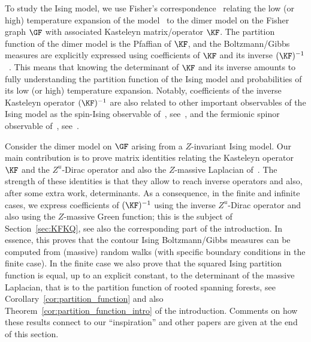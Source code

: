 \documentclass[a4paper,twoside,11pt]{article}
\begin{document}
To study the Ising model, we use Fisher's correspondence~\cite{Fisher} relating the low (or high) temperature expansion of the 
model~\cite{KramersWannier1,KramersWannier2} to the dimer model on the Fisher graph $\GF$ with associated Kasteleyn matrix/operator 
$\KF$. The partition function of the dimer model is the Pfaffian of $\KF$, and the Boltzmann/Gibbs measures are explicitly expressed
using coefficients of $\KF$ and its inverse $(\KF)^{-1}$~\cite{TF,Kenyon0,CKP,KOS,BoutillierdeTiliere:iso_perio}. This means that knowing the determinant of 
$\KF$ and its inverse amounts to fully understanding the partition function of the Ising model and probabilities of its low (or 
high) temperature expansion. Notably, coefficients of the inverse Kasteleyn operator $(\KF)^{-1}$ are also related to other 
important observables of the Ising model as the spin-Ising observable of~\cite{ChelkakSmirnov:ising}, see~\cite{CCK}, and
the fermionic spinor observable of~\cite{KadanoffCeva}, see~\cite{Dubedat}.

Consider the dimer model on $\GF$ arising from a $Z$-invariant Ising model. Our main contribution is to 
prove matrix identities relating the Kasteleyn operator $\KF$ and
the $Z^u$-Dirac operator and also the $Z$-massive Laplacian of~\cite{BdTR1}. The strength of these identities is that they allow
to reach inverse operators and also, after some extra work, determinants. As a consequence, in the finite and infinite cases,
we express coefficients of $(\KF)^{-1}$ using the inverse $Z^u$-Dirac operator and also using the $Z$-massive Green function; this is the subject of
Section~\ref{sec:KFKQ}, see also the corresponding part of the introduction. In essence, this proves that the contour Ising Boltzmann/Gibbs measures 
can 
be computed from (massive) random walks (with specific boundary conditions in the finite case). In the finite case we also prove
that the squared Ising partition function is equal, up to an explicit constant, to the determinant of the massive Laplacian, that is
to the partition function of rooted spanning forests, see Corollary~\ref{cor:partition_function} and also Theorem~\ref{cor:partition_function_intro} of the 
introduction. Comments on how
these results connect to our ``inspiration'' and other papers are given at the end of this section.
\end{document}
